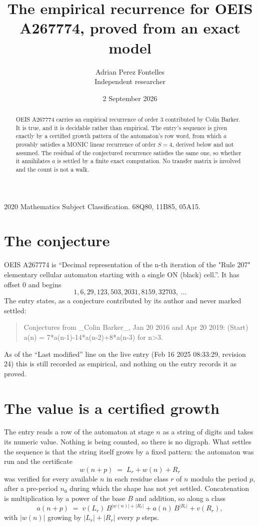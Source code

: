 \documentclass[11pt,a4paper]{article}
\title{The empirical recurrence for OEIS A267774, proved from an exact model}
\author{Adrian Perez Fontelles\\ \small Independent researcher}
\date{2 September 2026}
\theoremstyle{plain}
\theoremstyle{definition}
\begin{document}
\maketitle

\begin{abstract}
OEIS A267774 carries an empirical recurrence of order $3$ contributed by Colin Barker. It is true, and it is
decidable rather than empirical. The entry's sequence is given exactly by a certified growth pattern of the automaton's row word, from
which $a$ provably satisfies a MONIC linear recurrence of order $S=4$, derived below and not
assumed. The residual of the conjectured recurrence satisfies the same one, so whether it
annihilates $a$ is settled by a finite exact computation. No transfer matrix is involved and
the count is not a walk.
\end{abstract}

\noindent\small 2020 Mathematics Subject Classification. 68Q80, 11B85, 05A15.\normalsize

\section{The conjecture}

OEIS A267774 is ``Decimal representation of the n-th iteration of the "Rule 207" elementary cellular automaton starting with a single ON (black) cell.''. It has offset $0$ and begins
\[
1, 6, 29, 123, 503, 2031, 8159, 32703,\ \dots
\]
The entry states, as a conjecture contributed by its author and never marked settled:
\begin{quote}
Conjectures from \_Colin Barker\_, Jan 20 2016 and Apr 20 2019: (Start) a(n) = 7*a(n-1)-14*a(n-2)+8*a(n-3) for n>3.
\end{quote}
As of the ``Last modified'' line on the live entry (Feb 16 2025 08:33:29, revision 24)
this is still recorded as empirical, and nothing on the entry records it as proved.

\section{The value is a certified growth}

The entry reads a row of the automaton at stage $n$ as a string of digits and takes its
numeric value. Nothing is being counted, so there is no digraph. What settles the sequence is
that the string itself grows by a fixed pattern: the automaton was run and the certificate
\[
w(n+p)\;=\;L_r + w(n) + R_r
\]
was verified for every available $n$ in each residue class $r$ of $n$ modulo the period $p$,
after a pre-period $n_0$ during which the shape has not yet settled. Concatenation is
multiplication by a power of the base $B$ and addition, so along a class
\[
a(n+p)\;=\;v(L_r)\,B^{|w(n)|+|R_r|} + a(n)\,B^{|R_r|} + v(R_r),
\]
with $|w(n)|$ growing by $|L_r|+|R_r|$ every $p$ steps.
\end{document}
